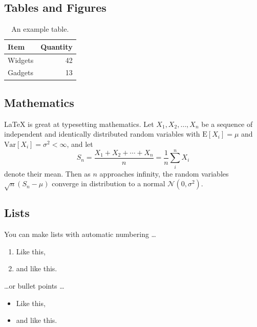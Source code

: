 \documentclass[12pt]{article}
\begin{document}
\subsection{Tables and Figures}

\begin{table}
\centering
\begin{tabular}{l|r}
Item & Quantity \\\hline
Widgets & 42 \\
Gadgets & 13
\end{tabular}
\caption{\label{tab:widgets}An example table.}
\end{table}

\subsection{Mathematics}

\LaTeX{} is great at typesetting mathematics. Let $X_1, X_2, \ldots, X_n$ be a sequence of independent and identically distributed random variables with $\text{E}[X_i] = \mu$ and $\text{Var}[X_i] = \sigma^2 < \infty$, and let
$$S_n = \frac{X_1 + X_2 + \cdots + X_n}{n}
      = \frac{1}{n}\sum_{i}^{n} X_i$$
denote their mean. Then as $n$ approaches infinity, the random variables $\sqrt{n}(S_n - \mu)$ converge in distribution to a normal $\mathcal{N}(0, \sigma^2)$.

\subsection{Lists}

You can make lists with automatic numbering \dots

\begin{enumerate}
\item Like this,
\item and like this.
\end{enumerate}
\dots or bullet points \dots
\begin{itemize}
\item Like this,
\item and like this.
\end{itemize}
\end{document}
